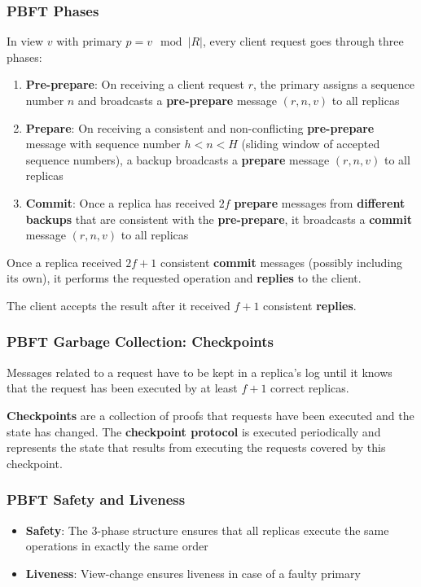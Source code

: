 \documentclass[12pt,A4]{extarticle}
\newcommand{\highlight}[1]{\textcolor{highlightColor}{\textbf{#1}}}
\begin{document}
\subsubsection{PBFT Phases}
In view $v$ with primary $p = v \mod |R|$, every client request goes through three phases:
\begin{enumerate}
  \item \textbf{Pre-prepare}: On receiving a client request $r$, the primary assigns a sequence number $n$ and broadcasts a \textbf{pre-prepare} message $(r, n, v)$ to all replicas
  \item \textbf{Prepare}: On receiving a consistent and non-conflicting \textbf{pre-prepare} message with sequence number $h < n < H$ (sliding window of accepted sequence numbers), a backup broadcasts a \textbf{prepare} message $(r, n, v)$ to all replicas
  \item \textbf{Commit}: Once a replica has received $2f$ \textbf{prepare} messages from \textbf{different backups} that are consistent with the \textbf{pre-prepare}, it broadcasts a \textbf{commit} message $(r, n, v)$ to all replicas
\end{enumerate}
Once a replica received $2f + 1$ consistent \textbf{commit} messages (possibly including its own), it performs the requested operation and \textbf{replies} to the client.\par
The client accepts the result after it received $f + 1$ consistent \textbf{replies}.

\subsubsection{PBFT Garbage Collection: Checkpoints}
Messages related to a request have to be kept in a replica's log until it knows that the request has been executed by at least $f+1$ correct replicas.\par
\textbf{Checkpoints} are a collection of proofs that requests have been executed and the state has changed. The \textbf{checkpoint protocol} is executed periodically and represents the state that results from executing the requests covered by this checkpoint.

\subsubsection{PBFT Safety and Liveness}
\begin{itemize}
  \item \highlight{Safety}: The 3-phase structure ensures that all replicas execute the same operations in exactly the same order
  \item \highlight{Liveness}: View-change ensures liveness in case of a faulty primary
\end{itemize}
\end{document}
